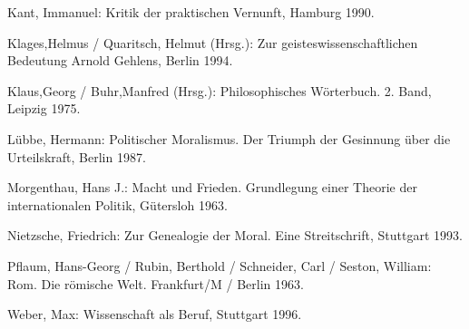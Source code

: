 \documentclass[12pt,a4paper]{article}
\begin{document}
\begin{thebibliography}{99}
 Kant, Immanuel: Kritik der praktischen Vernunft, Hamburg 1990.

 Klages,Helmus / Quaritsch, Helmut (Hrsg.): Zur
geisteswissenschaftlichen Bedeutung Arnold Gehlens, Berlin 1994.

 Klaus,Georg / Buhr,Manfred (Hrsg.): Philo\-soph\-isch\-es
Wör\-ter\-buch. 2. Band, Leip\-zig 1975.

 Lübbe, Hermann: Politischer Moralismus. Der Triumph der
  Gesinnung über die Urteilskraft, Berlin 1987.

 Morgenthau, Hans J.: Macht und Frieden. Grundlegung
einer Theorie der internationalen Politik, Gütersloh 1963.

 Nietzsche, Friedrich: Zur Genealogie der Moral. Eine
Streitschrift, Stuttgart 1993.

 Pflaum, Hans-Georg / Rubin, Berthold / Schneider,
Carl / Seston, William: Rom. Die römische Welt. Frankfurt/M / Berlin
1963.

 Weber, Max: Wissenschaft als Beruf, Stuttgart 1996.

\end{thebibliography}
\end{document}
